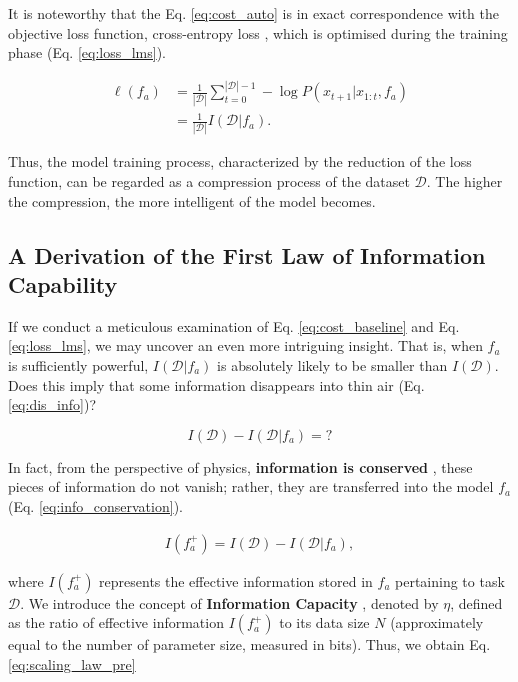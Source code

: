 \documentclass{article}
\theoremstyle{plain}
\theoremstyle{definition}
\theoremstyle{remark}
\begin{document}
It is noteworthy that the Eq. \ref{eq:cost_auto} is in exact correspondence with the objective loss function, cross-entropy loss \cite{Bishop1995}, which is optimised during the training phase (Eq. \ref{eq:loss_lms}).

\begin{equation}
\label{eq:loss_lms}
\begin{aligned}
    \ell(f_a) & = \frac{1}{|\mathcal{D}|}\sum_{t=0}^{|\mathcal{D}|-1} -\log P(x_{t+1}|x_{1:t}, f_a) \\
    & = \frac{1}{|\mathcal{D}|} I(\mathcal{D}|f_a).
\end{aligned}
\end{equation}

Thus, the model training process, characterized by the reduction of the loss function, can be regarded as a compression process of the dataset $\mathcal{D}$. The higher the compression, the more intelligent of the model becomes.

\subsection{A Derivation of the First Law of Information Capability}\label{subsec:derivation_lse}

If we conduct a meticulous examination of Eq. \ref{eq:cost_baseline} and Eq. \ref{eq:loss_lms}, we may uncover an even more intriguing insight. That is, when $f_a$ is sufficiently powerful, $I(\mathcal{D}|f_a)$ is absolutely likely to be smaller than $I(\mathcal{D})$. Does this imply that some information disappears into thin air (Eq. \ref{eq:dis_info})?

\begin{equation}
\label{eq:dis_info}
     I(\mathcal{D}) - I(\mathcal{D}|f_a) = \text{?}
\end{equation}

In fact, from the perspective of physics, \textbf{information is conserved} \cite{info_conservation_2013}, these pieces of information do not vanish; rather, they are transferred into the model $f_a$ (Eq. \ref{eq:info_conservation}). 

\begin{equation}
\label{eq:info_conservation}
\begin{aligned}
    I(f_a^{+}) = I(\mathcal{D}) - I(\mathcal{D}|f_a),
\end{aligned}
\end{equation}

where $I(f_a^{+})$ represents the effective information stored in $f_a$ pertaining to task $\mathcal{D}$. We introduce the concept of \textbf{Information Capacity} \cite{distillation_2021}, denoted by $\eta$, defined as the ratio of effective information $I(f_a^{+})$ to its data size $N$ (approximately equal to the number of parameter size, measured in bits). Thus, we obtain Eq. \ref{eq:scaling_law_pre}
\end{document}
